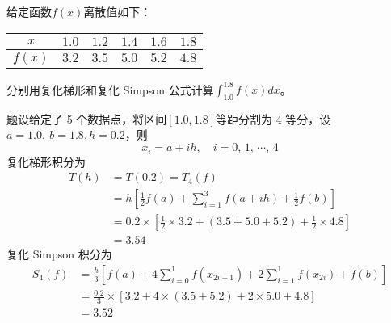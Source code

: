 \documentclass[11pt]{article}
\begin{document}
\maketitle

\thispagestyle{empty}

\newpage

\begin{question}

    \questiontext
    {
        给定函数$f(x)$离散值如下：
        \begin{table}[h]
            \centering
            \begin{tabular}{|c|c|c|c|c|c|}
                \hline
                $x$    & $1.0$ & $1.2$ & $1.4$ & $1.6$ & $1.8$ \\ \hline
                $f(x)$ & $3.2$ & $3.5$ & $5.0$ & $5.2$ & $4.8$ \\ \hline
            \end{tabular}
        \end{table}
        分别用复化梯形和复化 Simpson 公式计算$\displaystyle \int_{1.0}^{1.8}{f(x)dx}$。
    }
    \answer
    {
        题设给定了 5 个数据点，将区间$[1.0, 1.8]$等距分割为 4 等分，设$a = 1.0,\ b = 1.8, h = 0.2$，则
        $$
            x_i = a + ih,\quad i = 0,\, 1,\, \cdots,\, 4
        $$
        复化梯形积分为
        \begin{align*}
            T(h) & = T(0.2) = T_4(f)                                                                              \\
                 & = h \left[\frac{1}{2}f(a) + \sum_{i = 1}^{3}{f(a + ih)} + \frac{1}{2}f(b)\right]               \\
                 & = 0.2 \times \left[\frac{1}{2} \times 3.2 + (3.5 + 5.0 + 5.2) + \frac{1}{2} \times 4.8 \right] \\
                 & = 3.54
        \end{align*}
        复化 Simpson 积分为
        \begin{align*}
            S_4(f)
             & = \frac{h}{3} \left[f(a) + 4 \sum_{i = 0}^{1}{f(x_{2i + 1})} + 2\sum_{i = 1}^{1}{f(x_{2i})} + f(b)\right] \\
             & = \frac{0.2}{3} \times \left[3.2 + 4 \times (3.5 + 5.2) + 2 \times 5.0 + 4.8\right]                       \\
             & = 3.52
        \end{align*}
    }
\end{question}
\end{document}
